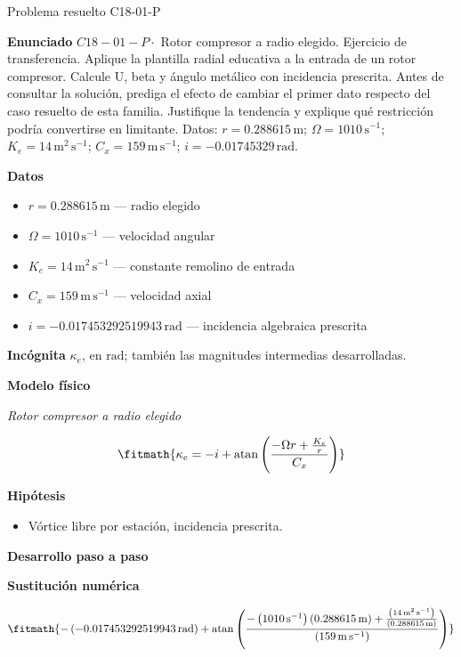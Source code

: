 \documentclass[10pt,openany]{book}
\begin{document}
\begin{studiumworked}{Problema resuelto C18-01-P}


\noindent\textbf{Enunciado}
\(C18-01-P \cdot\) Rotor compresor a radio elegido. Ejercicio de transferencia. Aplique la plantilla radial educativa a la entrada de un rotor compresor. Calcule U, beta y ángulo metálico con incidencia prescrita. Antes de consultar la solución, prediga el efecto de cambiar el primer dato respecto del caso resuelto de esta familia. Justifique la tendencia y explique qué restricción podría convertirse en limitante. Datos: \(r=0.288615\, \mathrm{m}\); \(\Omega=1010\, \mathrm{s}^{-1}\); \(K_e=14\, \mathrm{m}^{2}\,\mathrm{s}^{-1}\); \(C_x=159\, \mathrm{m}\,\mathrm{s}^{-1}\); \(i=-0.01745329\, \mathrm{rad}\).

\noindent\textbf{Datos}
\begin{itemize}
\item $r = 0.288615\,\mathrm{m}$ — radio elegido
\item $\Omega = 1010\,\mathrm{s}^{-1}$ — velocidad angular
\item $K_e = 14\,\mathrm{m}^{2}\,\mathrm{s}^{-1}$ — constante remolino de entrada
\item $C_x = 159\,\mathrm{m}\,\mathrm{s}^{-1}$ — velocidad axial
\item $i = -0.017453292519943\,\mathrm{rad}$ — incidencia algebraica prescrita
\end{itemize}

\noindent\textbf{Incógnita}
$\kappa_e$, en $\mathrm{rad}$; también las magnitudes intermedias desarrolladas.

\noindent\textbf{Modelo físico}

\noindent\textit{Rotor compresor a radio elegido}

\[
\fitmath{\kappa_e=- i + \operatorname{atan}{\left(\frac{- \Omega r + \frac{K_e}{r}}{C_x} \right)}}
\]

\noindent\textbf{Hipótesis}
\begin{itemize}
\item Vórtice libre por estación, incidencia prescrita.
\end{itemize}

\noindent\textbf{Desarrollo paso a paso}



\noindent\textbf{Sustitución numérica}

\[
\fitmath{- \left(-0.017453292519943\,\mathrm{rad}\right) + \operatorname{atan}{\left(\frac{- \left(1010\,\mathrm{s}^{-1}\right) \left(0.288615\,\mathrm{m}\right) + \frac{\left(14\,\mathrm{m}^{2}\,\mathrm{s}^{-1}\right)}{\left(0.288615\,\mathrm{m}\right)}}{\left(159\,\mathrm{m}\,\mathrm{s}^{-1}\right)} \right)}}
\]


\end{studiumworked}
\end{document}
